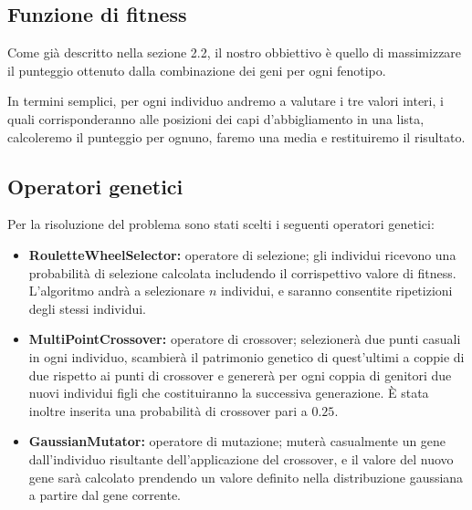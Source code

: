 \documentclass[a4paper, 11pt, oneside]{report}
\begin{document}
                \subsection{Funzione di fitness}
                \par \noindent Come già descritto nella sezione 2.2, il
                nostro obbiettivo è quello di massimizzare il punteggio ottenuto dalla combinazione dei geni per ogni
                fenotipo.
                \par \noindent In termini semplici, per ogni individuo andremo a valutare i tre valori interi, i quali
                corrisponderanno alle posizioni dei capi d'abbigliamento in una lista, calcoleremo il punteggio per ognuno,
                faremo una media e restituiremo il risultato.

                \subsection{Operatori genetici}
                Per la risoluzione del problema sono stati scelti i seguenti operatori genetici:
                \begin{itemize}
                    \item \textbf{RouletteWheelSelector:} operatore di selezione; gli individui ricevono una probabilità
                    di selezione calcolata includendo il corrispettivo valore di fitness. L'algoritmo andrà a selezionare
                    $n$ individui, e saranno consentite ripetizioni degli stessi individui.
                    \item \textbf{MultiPointCrossover:} operatore di crossover; selezionerà due punti casuali in ogni
                    individuo, scambierà il patrimonio genetico di quest'ultimi a coppie di due rispetto ai punti di
                    crossover e genererà per ogni coppia di genitori due nuovi individui figli che costituiranno la
                    successiva generazione. È stata inoltre inserita una probabilità di crossover pari a $0.25$.
                    \item \textbf{GaussianMutator:} operatore di mutazione; muterà casualmente un gene dall'individuo
                    risultante dell'applicazione del crossover, e il valore del nuovo gene sarà calcolato prendendo un
                    valore definito nella distribuzione gaussiana a partire dal gene corrente.
                \end{itemize}
\end{document}

